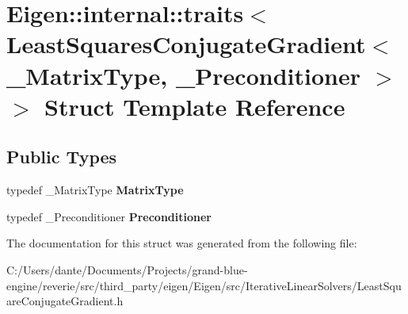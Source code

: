 \hypertarget{struct_eigen_1_1internal_1_1traits_3_01_least_squares_conjugate_gradient_3_01___matrix_type_00_01___preconditioner_01_4_01_4}{}\section{Eigen\+::internal\+::traits$<$ Least\+Squares\+Conjugate\+Gradient$<$ \+\_\+\+Matrix\+Type, \+\_\+\+Preconditioner $>$ $>$ Struct Template Reference}
\label{struct_eigen_1_1internal_1_1traits_3_01_least_squares_conjugate_gradient_3_01___matrix_type_00_01___preconditioner_01_4_01_4}
\subsection*{Public Types}
\begin{DoxyCompactItemize}
\item 
\mbox{\label{struct_eigen_1_1internal_1_1traits_3_01_least_squares_conjugate_gradient_3_01___matrix_type_00_01___preconditioner_01_4_01_4_a3d4afaf55e0afb29f11774075ba3345c}} 
typedef \+\_\+\+Matrix\+Type {\bfseries Matrix\+Type}
\item 
\mbox{\label{struct_eigen_1_1internal_1_1traits_3_01_least_squares_conjugate_gradient_3_01___matrix_type_00_01___preconditioner_01_4_01_4_a0e72eaaca694d18095ebf0edf113b465}} 
typedef \+\_\+\+Preconditioner {\bfseries Preconditioner}
\end{DoxyCompactItemize}


The documentation for this struct was generated from the following file\+:\begin{DoxyCompactItemize}
\item 
C\+:/\+Users/dante/\+Documents/\+Projects/grand-\/blue-\/engine/reverie/src/third\+\_\+party/eigen/\+Eigen/src/\+Iterative\+Linear\+Solvers/Least\+Square\+Conjugate\+Gradient.\+h\end{DoxyCompactItemize}
